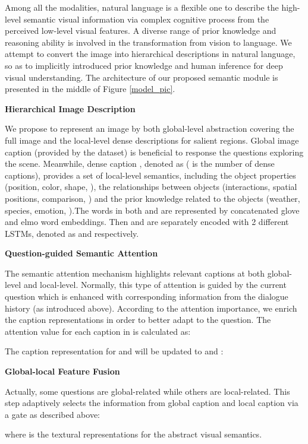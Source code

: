 \documentclass[letterpaper]{article} \usepackage{aaai20}  \usepackage{times}  \usepackage{helvet} \usepackage{courier}  \usepackage[hyphens]{url}  \usepackage{graphicx} \urlstyle{rm} \def\UrlFont{\rm}  \usepackage{graphicx}  \frenchspacing  \setlength{\pdfpagewidth}{8.5in}  \setlength{\pdfpageheight}{11in}  \usepackage{mathrsfs} \usepackage{amsfonts,amssymb}  \usepackage{tabularx} \usepackage{url}
\begin{document}
Among all the modalities, natural language is a flexible one to describe the high-level semantic visual information via complex cognitive process from the perceived low-level visual features. A diverse range of prior knowledge and reasoning ability is involved in the transformation from vision to language. We attempt to convert the image into hierarchical descriptions in natural language, so as to implicitly introduced prior knowledge and human inference for deep visual understanding. The architecture of our proposed semantic module is presented in the middle of Figure \ref{model_pic}. 

\textbf{Hierarchical Image Description}

We propose to represent an image by both global-level abstraction covering the full image and the local-level dense descriptions for salient regions. Global image caption  (provided by the dataset) is beneficial to response the questions exploring the scene. Meanwhile, dense caption \cite{johnson2016densecap}, denoted as  ( is the number of dense captions), provides a set of local-level semantics, including the object properties (position, color, shape, ), the relationships between objects (interactions, spatial positions, comparison, ) and the prior knowledge related to the objects (weather, species, emotion, ).The words in both  and  are represented by concatenated glove and elmo word embeddings. Then  and  are separately encoded with 2 different LSTMs, denoted as  and  respectively.

\textbf{Question-guided Semantic Attention}

The semantic attention mechanism highlights relevant captions at both global-level and local-level. Normally, this type of attention is guided by the current question which is enhanced with corresponding information from the dialogue history (as introduced above). According to the attention importance, we enrich the caption representations in order to better adapt to the question. The attention value for each caption in  is calculated as:


The caption representation for  and   will be updated to  and :



\textbf{Global-local Feature Fusion}

Actually, some questions are global-related while others are local-related. This step adaptively selects the information from global caption  and local caption  via a gate as described above:


where  is the textural representations for the abstract visual semantics.
\end{document}
